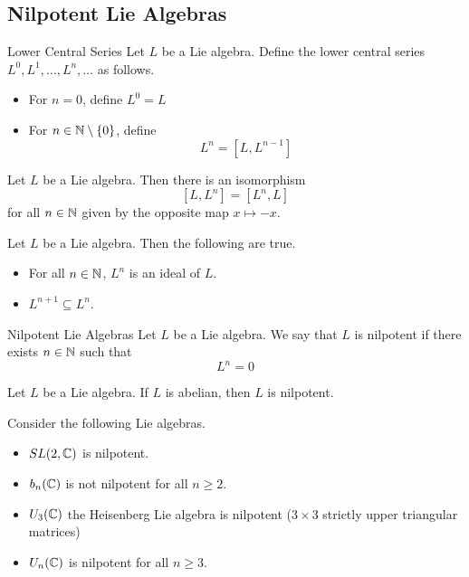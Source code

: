 \documentclass[a4paper]{article}
\begin{document}
\subsection{Nilpotent Lie Algebras}
\begin{defn}{Lower Central Series}{} Let $L$ be a Lie algebra. Define the lower central series $L^0,L^1,\dots,L^n,\dots$ as follows. 
\begin{itemize}
\item For $n=0$, define $L^0=L$
\item For $n\in\mathbb{N}\setminus\{0\}$, define $$L^n=[L,L^{n-1}]$$
\end{itemize}
\end{defn}

\begin{lmm}{}{} Let $L$ be a Lie algebra. Then there is an isomorphism $$[L,L^n]=[L^n,L]$$ for all $n\in\mathbb{N}$ given by the opposite map $x\mapsto -x$. 
\end{lmm}

\begin{lmm}{}{} Let $L$ be a Lie algebra. Then the following are true. 
\begin{itemize}
\item For all $n\in\mathbb{N}$, $L^n$ is an ideal of $L$. 
\item $L^{n+1}\subseteq L^n$. 
\end{itemize}
\end{lmm}

\begin{defn}{Nilpotent Lie Algebras}{} Let $L$ be a Lie algebra. We say that $L$ is nilpotent if there exists $n\in\mathbb{N}$ such that $$L^n=0$$
\end{defn}

\begin{lmm}{}{} Let $L$ be a Lie algebra. If $L$ is abelian, then $L$ is nilpotent. 
\end{lmm}

\begin{eg}{}{} Consider the following Lie algebras. 
\begin{itemize}
\item $SL(2,\mathbb{C})$ is nilpotent. 
\item $b_n(\mathbb{C})$ is not nilpotent for all $n\geq 2$. 
\item $U_3(\mathbb{C})$ the Heisenberg Lie algebra is nilpotent ($3\times 3$ strictly upper triangular matrices)
\item $U_n(\mathbb{C})$ is nilpotent for all $n\geq 3$. 
\end{itemize}
\end{eg}
\end{document}
